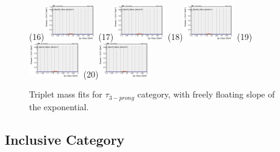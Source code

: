 \begin{figure}[h!]
        \subfigure(16){\includegraphics[width=0.2\textwidth]{power_law/plots/tauhB/massfit_tauhB_40bins_bdtcut0.31.png}}
        \subfigure(17){\includegraphics[width=0.2\textwidth]{power_law/plots/tauhB/massfit_tauhB_40bins_bdtcut0.35.png}}
        \subfigure(18){\includegraphics[width=0.2\textwidth]{power_law/plots/tauhB/massfit_tauhB_40bins_bdtcut0.41.png}}
        \subfigure(19){\includegraphics[width=0.2\textwidth]{power_law/plots/tauhB/massfit_tauhB_40bins_bdtcut0.47.png}}
        \subfigure(20){\includegraphics[width=0.2\textwidth]{power_law/plots/tauhB/massfit_tauhB_40bins_bdtcut0.53.png}}
        \caption{Triplet mass fits for $\tau_{3-prong}$ category, with freely floating slope of the exponential.}
        \label{fig:unfixed_tauhb}
\end{figure}

\newpage

\subsection{Inclusive Category}
\label{sec:all_cat}


